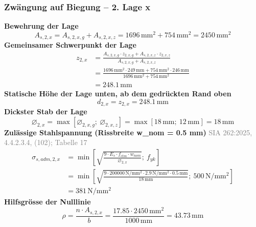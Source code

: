 \documentclass[11pt,a4paper]{article}
\newcommand{\normref}[1]{{\small\textcolor{gray}{#1}}}
\begin{document}
\subsubsection{Zwängung auf Biegung – 2. Lage x}
\noindent\textbf{Bewehrung der Lage}
\begin{equation*}
A_{s,2,x} = A_{s,2,x,g} + A_{s,2,x,z} = 1696\,\mathrm{mm}^{2} + 754\,\mathrm{mm}^{2} = 2450\,\mathrm{mm}^{2}
\end{equation*}
\noindent\textbf{Gemeinsamer Schwerpunkt der Lage}
\begin{equation*}
\begin{aligned}
  z_{2,x} &= \frac{A_{s,2,x,g} \cdot z_{2,x,g} + A_{s,2,x,z} \cdot z_{2,x,z}}{A_{s,2,x,g} + A_{s,2,x,z}} \\
  &= \frac{1696\,\mathrm{mm}^{2} \cdot 249\,\mathrm{mm} + 754\,\mathrm{mm}^{2} \cdot 246\,\mathrm{mm}}{1696\,\mathrm{mm}^{2} + 754\,\mathrm{mm}^{2}} \\
  &= 248.1\,\mathrm{mm}
\end{aligned}
\end{equation*}
\noindent\textbf{Statische Höhe der Lage unten, ab dem gedrückten Rand oben}
\begin{equation*}
d_{2,x} = z_{2,x} = 248.1\,\mathrm{mm}
\end{equation*}
\noindent\textbf{Dickster Stab der Lage}
\begin{equation*}
\varnothing_{2,x} = \max\left[\varnothing_{2,x,g};\ \varnothing_{2,x,z}\right] = \max\left[18\,\mathrm{mm};\ 12\,\mathrm{mm}\right] = 18\,\mathrm{mm}
\end{equation*}
\noindent\textbf{Zulässige Stahlspannung (Rissbreite w\_nom = 0.5 mm)} \hfill \normref{SIA 262:2025, 4.4.2.3.4, (102); Tabelle 17}
\begin{equation*}
\begin{aligned}
  \sigma_{s,adm,2,x} &= \min\left[\sqrt{\frac{9 \cdot E_s \cdot f_{ctm} \cdot w_{nom}}{\varnothing_{2,x}}};\ f_{yk}\right] \\
  &= \min\left[\sqrt{\frac{9 \cdot 200000\,\mathrm{N}/\mathrm{mm}^{2} \cdot 2.9\,\mathrm{N}/\mathrm{mm}^{2} \cdot 0.5\,\mathrm{mm}}{18\,\mathrm{mm}}};\ 500\,\mathrm{N}/\mathrm{mm}^{2}\right] \\
  &= 381\,\mathrm{N}/\mathrm{mm}^{2}
\end{aligned}
\end{equation*}
\noindent\textbf{Hilfsgrösse der Nulllinie}
\begin{equation*}
\rho = \frac{n \cdot A_{s,2,x}}{b} = \frac{17.85 \cdot 2450\,\mathrm{mm}^{2}}{1000\,\mathrm{mm}} = 43.73\,\mathrm{mm}
\end{equation*}
\end{document}
